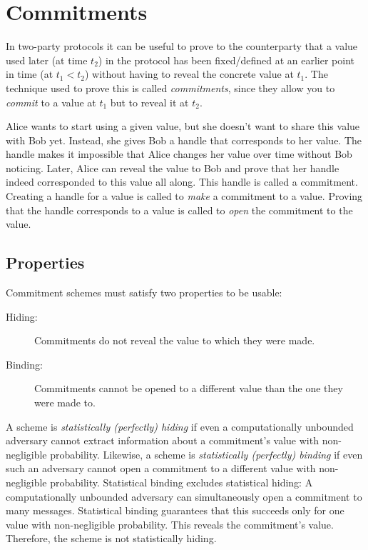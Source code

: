 \section{Commitments}

In two-party protocols it can be useful to prove to the counterparty that a value used later (at time $t_2$) in the protocol has been fixed/defined at an earlier point in time (at $t_1 < t_2$) without having to reveal the concrete value at $t_1$.
The technique used to prove this is called \emph{commitments}, since they allow you to \emph{commit} to a value at $t_1$ but to reveal it at $t_2$.

Alice wants to start using a given value, but she doesn't want to share this value with Bob yet.
Instead, she gives Bob a handle that corresponds to her value.
The handle makes it impossible that Alice changes her value over time without Bob noticing.
Later, Alice can reveal the value to Bob and prove that her handle indeed corresponded to this value all along.
This handle is called a commitment.
Creating a handle for a value is called to \emph{make} a commitment to a value.
Proving that the handle corresponds to a value is called to \emph{open} the commitment to the value.

\subsection{Properties}

Commitment schemes must satisfy two properties to be usable:

\begin{description}
    \item[Hiding:] Commitments do not reveal the value to which they were made.
    \item[Binding:] Commitments cannot be opened to a different value than the one they were made to.
\end{description}

A scheme is \emph{statistically (perfectly) hiding} if even a computationally unbounded adversary cannot extract information about a commitment's value with non-negligible probability.
Likewise,
a scheme is \emph{statistically (perfectly) binding} if even such an adversary cannot open a commitment to a different value with non-negligible probability.
%
Statistical binding excludes statistical hiding:
A computationally unbounded adversary can simultaneously open a commitment to many messages.
Statistical binding guarantees that this succeeds only for one value with non-negligible probability.
This reveals the commitment's value.
Therefore, the scheme is not statistically hiding.


